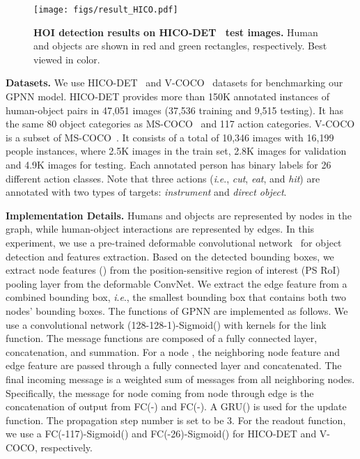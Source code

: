 \documentclass[runningheads]{llncs}
\newcommand{\ie}{\textit{i}.\textit{e}.}
\begin{document}
\begin{figure*}[t]
\centering
\texttt{[image: figs/result\_HICO.pdf]}
\caption{\textbf{HOI detection results on HICO-DET~\cite{chao2017learning} test images.} Human and objects are shown in red and green rectangles, respectively. Best viewed in color.}
\label{fig:hico_results}
\end{figure*}

\noindent\textbf{Datasets.} We use HICO-DET~\cite{chao2017learning} and V-COCO~\cite{gupta2015visual} datasets for benchmarking our GPNN model. HICO-DET provides more than 150K annotated instances of human-object pairs in 47,051 images (37,536 training and 9,515 testing). It has the same 80 object categories as MS-COCO~\cite{lin2014microsoft} and 117 action categories. V-COCO is a subset of MS-COCO~\cite{lin2014microsoft}. It consists of a total of 10,346 images with
16,199 people instances, where 2.5K images in the train set, 2.8K images for validation and 4.9K images for testing. Each annotated person has binary
labels for 26 different action classes. Note that three actions (\ie, \emph{cut}, \emph{eat}, and \emph{hit}) are annotated with two types of targets: \textit{instrument} and \textit{direct object}.

\noindent\textbf{Implementation Details.}  Humans and objects are represented by nodes in the graph, while human-object interactions are represented by edges. In this experiment, we use a pre-trained  deformable convolutional network~\cite{dai2017deformable} for object detection and features extraction. Based on the detected bounding boxes, we extract node features () from the position-sensitive region of interest (PS RoI) pooling layer from the deformable ConvNet.
We extract the edge feature from a combined bounding box, \ie, the smallest bounding box that contains both two nodes' bounding boxes.
The functions of GPNN are implemented as follows. We use a convolutional network (128-128-1)-Sigmoid() with  kernels for the link function.
The message functions are composed of a fully connected layer, concatenation, and summation. For a node , the neighboring node feature  and edge feature  are passed through a fully connected layer and concatenated. The final incoming message is a weighted sum of messages from all neighboring nodes. Specifically, the message for node  coming from node  through edge  is the concatenation of output from FC(-) and FC(-). A GRU() is used for the update function. The propagation step number  is set to be 3. For the readout function, we use a FC(-117)-Sigmoid() and FC(-26)-Sigmoid() for HICO-DET and V-COCO, respectively.
\end{document}
